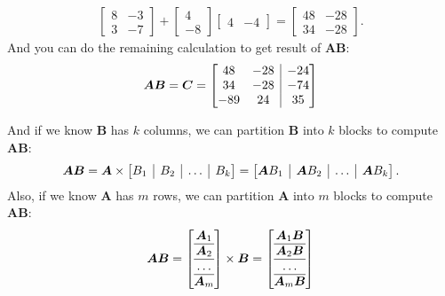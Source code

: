 \begin{enumerate}
\begin{example}
\begin{gather*}
\begin{bmatrix}
8&-3\\3&-7
\end{bmatrix}+\begin{bmatrix}
4\\-8
\end{bmatrix}\begin{bmatrix}
4&-4
\end{bmatrix}=\begin{bmatrix}
48&-28\\34&-28
\end{bmatrix}.
\end{gather*}
And you can do the remaining calculation to get result of $\bm{AB}$:
\[
\bm{AB}=\bm C=\left[\begin{array}{@{}cc|c@{}}
48&-28&-24\\34&-28&-74\\-89&24&35
\end{array}\right]
\]
\end{example}
And if we know $\bm B$ has $k$ columns, we can partition $\bm B$ into $k$ blocks to compute $\bm{AB}$:
\[
\bm{AB}=\bm A\x
\left[
\begin{array}{@{}c|c|c|c@{}}
B_1&B_2&\dots&B_k
\end{array}\right]
=\left[
\begin{array}{@{}c|c|c|c@{}}
\bm AB_1&\bm AB_2&\dots&\bm AB_k
\end{array}\right].
\]
Also, if we know $\bm A$ has $m$ rows, we can partition $\bm A$ into $m$ blocks to compute $\bm{AB}$:
\[
\bm{AB}=\left[\begin{array}{@{}c@{}}
\bm A_1\\
\hline
\bm A_2\\
\hline
\dots\\
\hline
\bm A_{m}
\end{array}\right]\x\bm B
=\left[\begin{array}{@{}c@{}}
\bm A_1\bm B\\
\hline
\bm A_2\bm B\\
\hline
\dots\\
\hline
\bm A_{m}\bm B
\end{array}\right]
\]
\end{enumerate}
